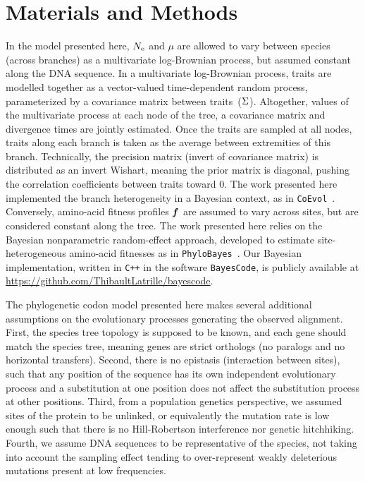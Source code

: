 \section{Materials and Methods}
\label{sec:MatMet}

In the model presented here, $N_{\text{e}}$ and $\mu$ are allowed to vary between species (across branches) as a multivariate log-Brownian process, but assumed constant along the \acrshort{DNA} sequence.
In a multivariate log-Brownian process, traits are modelled together as a vector-valued time-dependent random process, parameterized by a covariance matrix between traits~($\Sigma$).
Altogether, values of the multivariate process at each node of the tree, a covariance matrix and divergence times are jointly estimated.
Once the traits are sampled at all nodes, traits along each branch is taken as the average between extremities of this branch.
Technically, the precision matrix (invert of covariance matrix) is distributed as an invert Wishart, meaning the prior matrix is diagonal, pushing the correlation coefficients between traits toward $0$.
The work presented here implemented the branch heterogeneity in a Bayesian context, as in \texttt{CoEvol}~\citep{Lartillot2011}.
Conversely, amino-acid fitness profiles $\bm{f}$ are assumed to vary across sites, but are considered constant along the tree.
The work presented here relies on the Bayesian nonparametric random-effect approach, developed to estimate site-heterogeneous amino-acid fitnesses as in \texttt{PhyloBayes}~\citep{Rodrigue2010}.
Our Bayesian implementation, written in \texttt{C++} in the software \texttt{BayesCode}, is publicly available at \url{https://github.com/ThibaultLatrille/bayescode}.

The phylogenetic codon model presented here makes several additional assumptions on the evolutionary processes generating the observed alignment.
First, the species tree topology is supposed to be known, and each gene should match the species tree, meaning genes are strict orthologs (no paralogs and no horizontal transfers).
Second, there is no epistasis (interaction between sites), such that any position of the sequence has its own independent evolutionary process and a substitution at one position does not affect the substitution process at other positions.
Third, from a population genetics perspective, we assumed sites of the protein to be unlinked, or equivalently the mutation rate is low enough such that there is no Hill-Robertson interference nor genetic hitchhiking.
Fourth, we assume \acrshort{DNA} sequences to be representative of the species, not taking into account the sampling effect tending to over-represent weakly deleterious mutations present at low frequencies.

